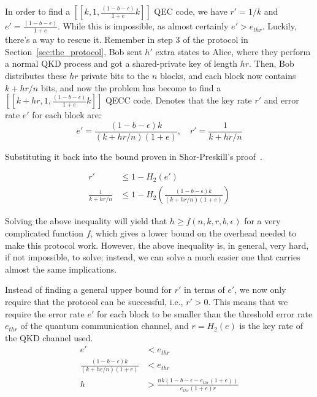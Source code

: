 \documentclass[%
 reprint,
superscriptaddress,
 amsmath,amssymb,
 aps,
]{revtex4-2}
\begin{document}
In order to find a $[[k, 1,\frac{(1-b-\epsilon)}{1+e}k]]$ QEC code, we have $r'=1/k$ and $e'=\frac{(1-b-\epsilon)}{1+e}$. While this is impossible, as almost certainly $e'>e_{thr}$. Luckily, there's a way to rescue it. Remember in step 3 of the protocol in Section~\ref{sec:the_protocol}, Bob sent $h'$ extra states to Alice, where they perform a normal QKD process and got a shared-private key of length $hr$. Then, Bob distributes these $hr$ private bits to the $n$ blocks, and each block now contains $k+hr/n$ bits, and now the problem has become to find a $[[k+hr, 1, \frac{(1-b-\epsilon)}{1+e}k]]$ QECC code. Denotes that the key rate $r'$ and error rate $e'$ for each block are:
\begin{equation}
    e'=\frac{(1-b-\epsilon)k}{(k+hr/n)(1+e)}, \quad r'=\frac{1}{k+hr/n}
\end{equation}

Substituting it back into the bound proven in Shor-Preskill's proof~\cite{Shor_Preskill_Proof1}.

\begin{equation}
\begin{split}
    r'&\le1-H_2(e')\\
    \frac{1}{k+hr/n}&\le1-H_2\left(\frac{(1-b-\epsilon)k}{(k+hr/n)(1+e)}\right)
\end{split}
\end{equation}

Solving the above inequality will yield that $h\ge f(n, k, r, b,\epsilon)$ for a very complicated function $f$, which gives a lower bound on the overhead needed to make this protocol work. However, the above inequality is, in general, very hard, if not impossible, to solve; instead, we can solve a much easier one that carries almost the same implications.

Instead of finding a general upper bound for $r'$ in terms of $e'$, we now only require that the protocol can be successful, i.e., $r'>0$. This means that we require the error rate $e'$ for each block to be smaller than the threshold error rate $e_{thr}$ of the quantum communication channel, and $r=H_2(e)$ is the key rate of the QKD channel used.
\begin{equation}
\begin{split}
    e'&< e_{thr}\\
    \frac{(1-b-\epsilon)k}{(k+hr/n)(1+e)}&< e_{thr}\\
    h&>\frac{nk(1-b-\epsilon-e_{thr}(1+e))}{e_{thr}(1+e)r}
\end{split}
\label{eq:lower_bound_h}
\end{equation}
\end{document}
